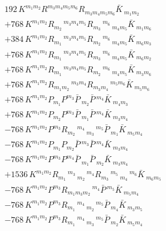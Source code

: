 \begin{align}
&192\,K^{{m_{1}} {m_{2}}} R^{{m_{3}} {m_{4}} {m_{5}} {m_{6}}} R_{{m_{3}} {m_{4}} {m_{5}} {m_{6}}} \bar{K}\,_{{m_{1}} {m_{2}}}\\
&+768\,K^{{m_{1}} {m_{2}}} R_{{m_{2}}}\,^{{m_{3}} {m_{4}} {m_{5}}} R_{{m_{3}}}\,^{{m_{6}}}\,_{{m_{4}} {m_{5}}} \bar{K}\,_{{m_{1}} {m_{6}}}\\
&+384\,K^{{m_{1}} {m_{2}}} R_{{m_{1}}}\,^{{m_{3}} {m_{4}} {m_{5}}} R_{{m_{2}}}\,^{{m_{6}}}\,_{{m_{4}} {m_{5}}} \bar{K}\,_{{m_{6}} {m_{3}}}\\
&+768\,K^{{m_{1}} {m_{2}}} R_{{m_{1}}}\,^{{m_{3}} {m_{4}} {m_{5}}} R_{{m_{3}}}\,^{{m_{6}}}\,_{{m_{4}} {m_{5}}} \bar{K}\,_{{m_{6}} {m_{2}}}\\
&+768\,K^{{m_{1}} {m_{2}}} R_{{m_{1}}}\,^{{m_{3}} {m_{4}} {m_{5}}} R_{{m_{2}}}\,^{{m_{6}}}\,_{{m_{4}} {m_{5}}} \bar{K}\,_{{m_{3}} {m_{6}}}\\
&+768\,K^{{m_{1}} {m_{2}}} R_{{m_{1}} {m_{2}}}\,^{{m_{3}} {m_{4}}} R_{{m_{3}} {m_{4}}}\,^{{m_{5}} {m_{6}}} \bar{K}\,_{{m_{5}} {m_{6}}}\\
&+768\,K^{{m_{1}} {m_{2}}} P_{{m_{1}}} P^{{m_{3}}} \bar{P}\,_{{m_{2}}} \bar{P}\,^{{m_{4}}} \bar{K}\,_{{m_{4}} {m_{3}}}\\
&+768\,K^{{m_{1}} {m_{2}}} P_{{m_{2}}} P^{{m_{3}}} \bar{P}\,_{{m_{1}}} \bar{P}\,^{{m_{4}}} \bar{K}\,_{{m_{3}} {m_{4}}}\\
&-768\,K^{{m_{1}} {m_{2}}} P^{{m_{3}}} R_{{m_{2}}}\,^{{m_{4}}}\,_{{m_{3}}}\,^{{m_{5}}} \bar{P}\,_{{m_{1}}} \bar{K}\,_{{m_{5}} {m_{4}}}\\
&-768\,K^{{m_{1}} {m_{2}}} P_{{m_{1}}} P_{{m_{2}}} \bar{P}\,^{{m_{3}}} \bar{P}\,^{{m_{4}}} \bar{K}\,_{{m_{3}} {m_{4}}}\\
&-768\,K^{{m_{1}} {m_{2}}} P^{{m_{3}}} P^{{m_{4}}} \bar{P}\,_{{m_{1}}} \bar{P}\,_{{m_{2}}} \bar{K}\,_{{m_{3}} {m_{4}}}\\
&+1536\,K^{{m_{1}} {m_{2}}} R_{{m_{1}}}\,^{{m_{3}}}\,_{{m_{2}}}\,^{{m_{4}}} R_{{m_{3}}}\,^{{m_{5}}}\,_{{m_{4}}}\,^{{m_{6}}} \bar{K}\,_{{m_{6}} {m_{5}}}\\
&-768\,K^{{m_{1}} {m_{2}}} P^{{m_{3}}} R_{{m_{1}} {m_{3}} {m_{2}}}\,^{{m_{4}}} \bar{P}\,^{{m_{5}}} \bar{K}\,_{{m_{5}} {m_{4}}}\\
&-768\,K^{{m_{1}} {m_{2}}} P^{{m_{3}}} R_{{m_{1}}}\,^{{m_{4}}}\,_{{m_{2}}}\,^{{m_{5}}} \bar{P}\,_{{m_{4}}} \bar{K}\,_{{m_{3}} {m_{5}}}\\
&-768\,K^{{m_{1}} {m_{2}}} P^{{m_{3}}} R_{{m_{1}}}\,^{{m_{4}}}\,_{{m_{3}}}\,^{{m_{5}}} \bar{P}\,_{{m_{2}}} \bar{K}\,_{{m_{5}} {m_{4}}}\\

\end{align}
